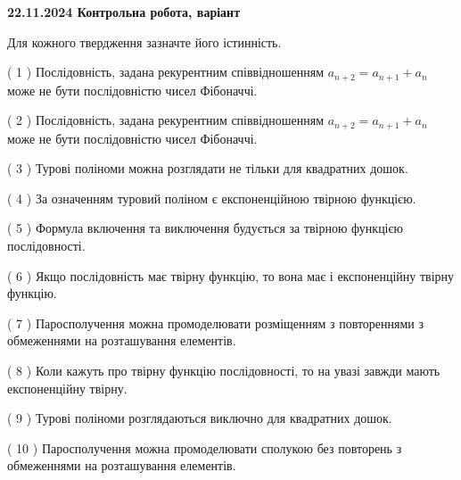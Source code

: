 \documentclass[12pt, ukrainian]{article}
\begin{document}
\vspace{4mm}
\newpage
\begin {large}

\textbf{22.11.2024 Контрольна робота, варіант  }\par


{
Для кожного твердження зазначте його істинність.\par
\vspace{2mm}
( 1 ) Послідовність, задана рекурентним співвідношенням $a_{n+2}=a_{n+1}+a_{n}$ може не бути послідовністю чисел Фібоначчі.%

( 2 ) Послідовність, задана рекурентним співвідношенням $a_{n+2}=a_{n+1}+a_{n}$ може не бути послідовністю чисел Фібоначчі.%

( 3 ) Турові поліноми можна розглядати не тільки для квадратних дошок.%

( 4 ) За означенням туровий поліном є експоненційною твірною функцією.%

( 5 ) Формула включення та виключення будується за твірною функцією послідовності.%

( 6 ) Якщо послідовність має твірну функцію, то вона має і експоненційну твірну функцію.%

( 7 ) Паросполучення можна промоделювати розміщенням з повтореннями з обмеженнями на розташування елементів.%

( 8 ) Коли кажуть про твірну функцію послідовності, то на увазі завжди мають експоненційну твірну.%

( 9 ) Турові поліноми розглядаються виключно для квадратних дошок.%

( 10 ) Паросполучення можна промоделювати сполукою без повторень з обмеженнями на розташування елементів.%


\vspace{5mm}
}
\end {large}
\end{document}
